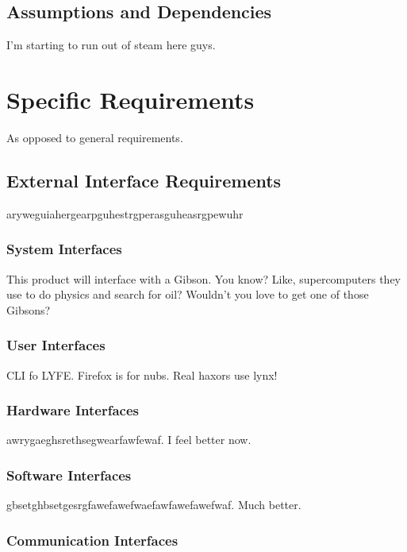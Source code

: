 \documentclass{scrreprt}
\begin{document}
\section{Assumptions and Dependencies}

I'm starting to run out of steam here guys.

\chapter{Specific Requirements}

As opposed to general requirements.

\section{External Interface Requirements}

aryweguiahergearpguhestrgperasguheasrgpewuhr

\subsection{System Interfaces}

This product will interface with a Gibson. You know? Like, supercomputers 
they use to do physics and search for oil? Wouldn't you love to get one of 
those Gibsons?

\subsection{User Interfaces}

CLI fo LYFE. Firefox is for nubs. Real haxors use lynx!

\subsection{Hardware Interfaces}

awrygaeghsrethsegwearfawfewaf. I feel better now.

\subsection{Software Interfaces}

gbsetghbsetgesrgfawefawefwaefawfawefawefwaf. Much better.

\subsection{Communication Interfaces}
\end{document}
